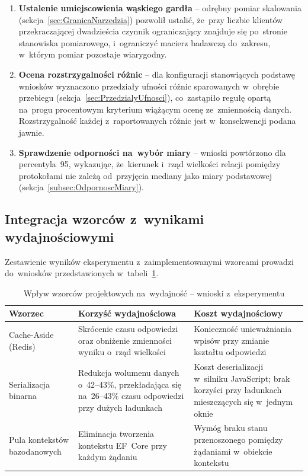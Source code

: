 \begin{enumerate}
    \item \textbf{Ustalenie umiejscowienia wąskiego gardła} -- odrębny pomiar skalowania (sekcja~\ref{sec:GranicaNarzedzia}) pozwolił ustalić, że~przy liczbie klientów przekraczającej dwadzieścia czynnik ograniczający znajduje się po~stronie stanowiska pomiarowego, i~ograniczyć macierz badawczą do~zakresu, w~którym pomiar pozostaje wiarygodny.

    \item \textbf{Ocena rozstrzygalności różnic} -- dla konfiguracji stanowiących podstawę wniosków wyznaczono przedziały ufności różnic sparowanych w~obrębie przebiegu (sekcja~\ref{sec:PrzedzialyUfnosci}), co~zastąpiło regułę opartą na~progu procentowym kryterium wiążącym ocenę ze~zmiennością danych. Rozstrzygalność każdej z~raportowanych różnic jest w~konsekwencji podana jawnie.

    \item \textbf{Sprawdzenie odporności na~wybór miary} -- wnioski powtórzono dla percentyla~95, wykazując, że~kierunek i~rząd wielkości relacji pomiędzy protokołami nie zależą od~przyjęcia mediany jako miary podstawowej (sekcja~\ref{subsec:OdpornoscMiary}).
\end{enumerate}

\subsection{Integracja wzorców z~wynikami wydajnościowymi}
\label{subsec:IntegracjaWzorcow}

Zestawienie wyników eksperymentu z~zaimplementowanymi wzorcami prowadzi do~wniosków przedstawionych w~tabeli~\ref{tab:PatternsImpact}.

\begin{table}[htb]
\centering
\footnotesize
\caption{Wpływ wzorców projektowych na~wydajność -- wnioski z~eksperymentu}
\label{tab:PatternsImpact}
\begin{tabular}{|p{3.2cm}|p{4.5cm}|p{4.5cm}|}
\hline
\textbf{Wzorzec} & \textbf{Korzyść wydajnościowa} & \textbf{Koszt wydajnościowy} \\
\hline
Cache-Aside (Redis) & Skrócenie czasu odpowiedzi oraz obniżenie zmienności wyniku o~rząd wielkości & Konieczność unieważniania wpisów przy zmianie kształtu odpowiedzi \\
\hline
Serializacja binarna & Redukcja wolumenu danych o~42--43\%, przekładająca się na~26--43\% czasu odpowiedzi przy dużych ładunkach & Koszt deserializacji w~silniku JavaScript; brak korzyści przy ładunkach mieszczących się w~jednym oknie \\
\hline
Pula kontekstów bazodanowych & Eliminacja tworzenia kontekstu EF~Core przy każdym żądaniu & Wymóg braku stanu przenoszonego pomiędzy żądaniami w~obiekcie kontekstu \\
\hline
\end{tabular}
\end{table}

